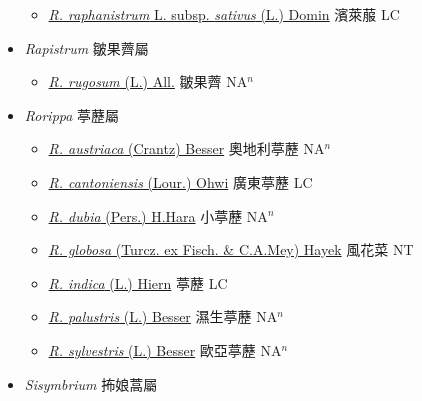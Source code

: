 \begin{itemize}
  \begin{itemize}
        \item[] \href{http://www.theplantlist.org/tpl1.1/search?q=Raphanus+raphanistrum+subsp.+sativus}{\textit{R. raphanistrum} L. subsp. \textit{sativus} (L.) Domin}     濱萊菔 LC
  \end{itemize}
 \item[] \textit{Rapistrum} 皺果薺屬
                    
  \begin{itemize}
        \item[] \href{http://www.theplantlist.org/tpl1.1/search?q=Rapistrum+rugosum}{\textit{R. rugosum} (L.) All.}   皺果薺 NA$^n$
  \end{itemize}
 \item[] \textit{Rorippa} 葶藶屬
                    
  \begin{itemize}
        \item[] \href{http://www.theplantlist.org/tpl1.1/search?q=Rorippa+austriaca}{\textit{R. austriaca} (Crantz) Besser}   奧地利葶藶 NA$^n$
        \item[] \href{http://www.theplantlist.org/tpl1.1/search?q=Rorippa+cantoniensis}{\textit{R. cantoniensis} (Lour.) Ohwi}   廣東葶藶 LC
        \item[] \href{http://www.theplantlist.org/tpl1.1/search?q=Rorippa+dubia}{\textit{R. dubia} (Pers.) H.Hara}   小葶藶 NA$^n$
        \item[] \href{http://www.theplantlist.org/tpl1.1/search?q=Rorippa+globosa}{\textit{R. globosa} (Turcz. ex Fisch. \& C.A.Mey) Hayek}   風花菜 NT
        \item[] \href{http://www.theplantlist.org/tpl1.1/search?q=Rorippa+indica}{\textit{R. indica} (L.) Hiern}   葶藶 LC
        \item[] \href{http://www.theplantlist.org/tpl1.1/search?q=Rorippa+palustris}{\textit{R. palustris} (L.) Besser}   濕生葶藶 NA$^n$
        \item[] \href{http://www.theplantlist.org/tpl1.1/search?q=Rorippa+sylvestris}{\textit{R. sylvestris} (L.) Besser}   歐亞葶藶 NA$^n$
  \end{itemize}
 \item[] \textit{Sisymbrium} 抪娘蒿屬
                    

\end{itemize}
